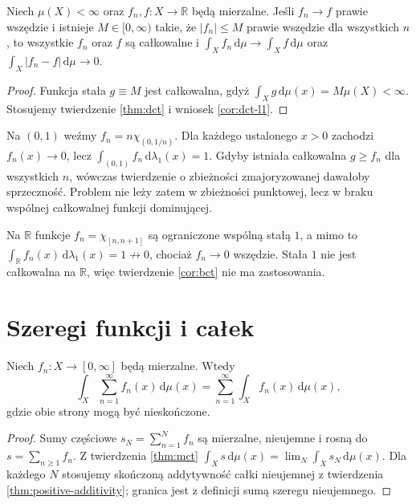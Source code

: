 \begin{wniosek}
\label{cor:bct}
Niech $\mu(X)<\infty$ oraz $f_n,f:X\to\mathbb R$
będą mierzalne. Jeśli $f_n\to f$ prawie wszędzie
i istnieje $M\in[0,\infty)$ takie, że $|f_n|\le M$
prawie wszędzie dla wszystkich $n$, to wszystkie $f_n$ oraz $f$ są całkowalne i
$\int_X f_n\,\mathrm d\mu\to\int_X f\,\mathrm d\mu$ oraz $\int_X|f_n-f|\,\mathrm d\mu\to0$.
\end{wniosek}
\begin{proof}
Funkcja stała $g\equiv M$ jest całkowalna,
gdyż $\int_X g\,\mathrm d\mu(x)=M\mu(X)<\infty$.
Stosujemy twierdzenie \ref{thm:dct} i wniosek
\ref{cor:dct-l1}.
\end{proof}

\begin{przyklad}
Na $(0,1)$ weźmy
$f_n=n\chi_{(0,1/n)}$.
Dla każdego ustalonego $x>0$ zachodzi $f_n(x)\to0$,
lecz $\int_{(0,1)}f_n\,\mathrm d\lambda_1(x)=1$.
Gdyby istniała całkowalna $g\ge f_n$ dla wszystkich
$n$, wówczas twierdzenie o zbieżności zmajoryzowanej
dawałoby sprzeczność. Problem nie leży zatem
w zbieżności punktowej, lecz w braku wspólnej
całkowalnej funkcji dominującej.
\end{przyklad}

\begin{przyklad}
Na $\mathbb R$ funkcje $f_n=\chi_{[n,n+1]}$
są ograniczone wspólną stałą $1$, a mimo to
$\int_{\mathbb R}f_n(x)\,\mathrm d\lambda_1(x)=1\not\to0$, chociaż $f_n\to0$ wszędzie.
Stała $1$ nie jest całkowalna na $\mathbb R$,
więc twierdzenie \ref{cor:bct} nie ma zastosowania.
\end{przyklad}

\section{Szeregi funkcji i całek}

\begin{twierdzenie}
\label{thm:sum-nonnegative-integrals}
Niech $f_n:X\to[0,\infty]$ będą mierzalne. Wtedy
\begin{equation}\label{eq:sum-nonnegative-integrals}
\int_X\sum_{n=1}^{\infty}f_n(x)\,\mathrm d\mu(x)
=\sum_{n=1}^{\infty}\int_Xf_n(x)\,\mathrm d\mu(x),
\end{equation}
gdzie obie strony mogą być nieskończone.
\end{twierdzenie}
\begin{proof}
Sumy częściowe $s_N=\sum_{n=1}^N f_n$ są
mierzalne, nieujemne i rosną do
$s=\sum_{n\ge1}f_n$. Z twierdzenia \ref{thm:mct}
$\int_Xs\,\mathrm d\mu(x)=\lim_N\int_Xs_N\,\mathrm d\mu(x)$.
Dla każdego $N$ stosujemy skończoną addytywność
całki nieujemnej z twierdzenia
\ref{thm:positive-additivity}; granica jest
z definicji sumą szeregu nieujemnego.
\end{proof}

